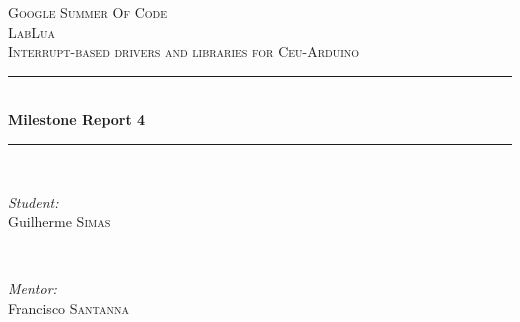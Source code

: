 \documentclass{article}
\begin{document}
\begin{titlepage}

\newcommand{\HRule}{\rule{\linewidth}{0.5mm}} %

\center %
 

\textsc{\LARGE Google Summer Of Code}\\[1.5cm] %
\textsc{\Large LabLua}\\[0.5cm] %
\textsc{\large Interrupt-based drivers and libraries for Ceu-Arduino}\\[0.5cm] %


\HRule \\[0.4cm]
{ \huge \bfseries Milestone Report 4}\\[0.4cm] %
\HRule \\[1.5cm]
 

\begin{minipage}{0.4\textwidth}
\begin{flushleft} \large
\emph{Student:}\\
Guilherme \textsc{Simas} %
\end{flushleft}
\end{minipage}
~
\begin{minipage}{0.4\textwidth}
\begin{flushright} \large
\emph{Mentor:} \\
Francisco \textsc{Santanna} %
\end{flushright}
\end{minipage}\\[4cm]



\end{titlepage}
\end{document}
